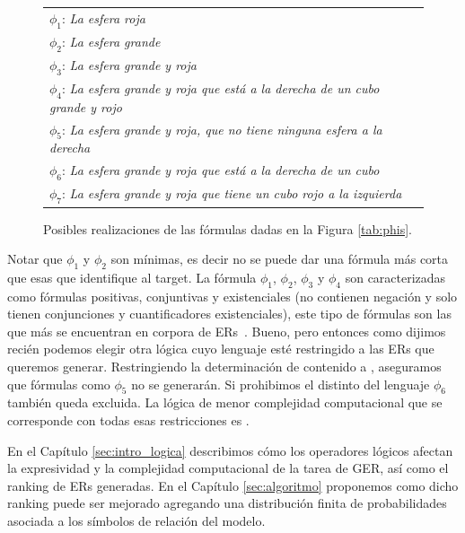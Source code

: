 \begin{figure}[h]

\begin{tabular}{l}
 $\phi_1$: {\it La esfera roja}\\[1pt]
 $\phi_2$: {\it La esfera grande}\\[1pt]
 $\phi_3$: {\it La esfera grande y roja}\\[1pt]
 $\phi_4$: {\it La esfera grande y roja que est\'a a la derecha de un cubo grande y rojo}\\[1pt]
 $\phi_5$: {\it La esfera grande y roja, que no tiene ninguna esfera a la derecha}\\[1pt]
 $\phi_6$: {\it La esfera grande y roja que est\'a a la derecha de un cubo}\\[1pt]
 $\phi_7$: {\it La esfera grande y roja que tiene un cubo rojo a la izquierda}\\[1pt]
\end{tabular}
\caption{Posibles realizaciones de las f\'ormulas dadas en la Figura \protect\ref{tab:phis}.}\label{tab:realizaciones-phis}
\end{figure}

Notar que $\phi_1$ y $\phi_2$ son m\'inimas, es decir no se puede dar una f\'ormula m\'as corta que esas que identifique al target.
La f\'ormula $\phi_1$, $\phi_2$, $\phi_3$ y $\phi_4$ son caracterizadas como f\'ormulas positivas, conjuntivas y existenciales (no contienen negaci\'on y solo tienen conjunciones y cuantificadores existenciales), este tipo de f\'ormulas son las que m\'as se encuentran en corpora de ERs~\cite{viethen06:_algor_for_gener_refer_expres,deemter06:_build_seman_trans_corpus_for,gre3d3}. Bueno, pero entonces como dijimos reci\'en podemos elegir otra l\'ogica cuyo lenguaje est\'e restringido a las ERs que queremos generar. Restringiendo la determinaci\'on de contenido a \EPFOL, aseguramos que f\'ormulas como  $\phi_5$ no se generar\'an. Si prohibimos el distinto del lenguaje $\phi_6$ tambi\'en queda excluida. La l\'ogica de menor complejidad computacional que se corresponde con todas esas restricciones es \EL. 

En el Cap\'itulo \ref{sec:intro_logica} describimos c\'omo los operadores l\'ogicos afectan la expresividad y la complejidad computacional de la tarea de GER, as\'i como el ranking de ERs generadas. En el Cap\'itulo \ref{sec:algoritmo} proponemos como dicho ranking puede ser mejorado agregando una distribuci\'on finita de probabilidades asociada a los s\'imbolos de relaci\'on del modelo.



